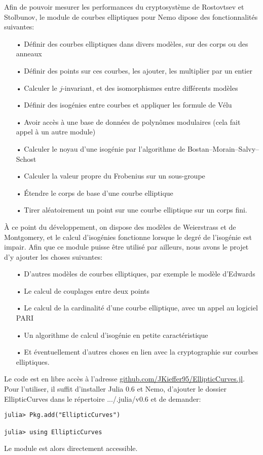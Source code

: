 \documentclass[11pt,a4paper]{article}
\renewcommand{\v}{\vspace{5mm}}
\theoremstyle{definition}
\begin{document}
Afin de pouvoir mesurer les performances du cryptosystème de Rostovtsev et Stolbunov, le module de courbes elliptiques pour Nemo dipose des fonctionnalités suivantes:
\begin{itemize}
\item[•] Définir des courbes elliptiques dans divers modèles, sur des corps ou des anneaux
\item[•] Définir des points sur ces courbes, les ajouter, les multiplier par un entier
\item[•] Calculer le $j$-invariant, et des isomorphismes entre différents modèles
\item[•] Définir des isogénies entre courbes et appliquer les formule de Vélu
\item[•] Avoir accès à une base de données de polynômes modulaires (cela fait appel à un autre module)
\item[•] Calculer le noyau d'une isogénie par l'algorithme de Bostan--Morain--Salvy--Schost
\item[•] Calculer la valeur propre du Frobenius sur un sous-groupe
\item[•] Étendre le corps de base d'une courbe elliptique
\item[•] Tirer aléatoirement un point sur une courbe elliptique sur un corps fini.
\end{itemize}

\v
À ce point du développement, on dispose des modèles de Weierstrass et de Montgomery, et le calcul d'isogénies fonctionne lorsque le degré de l'isogénie est impair. Afin que ce module puisse être utilisé par ailleurs, nous avons le projet d'y ajouter les choses suivantes:

\begin{itemize}
\item[•] D'autres modèles de courbes elliptiques, par exemple le modèle d'Edwards
\item[•] Le calcul de couplages entre deux points
\item[•] Le calcul de la cardinalité d'une courbe elliptique, avec un appel au logiciel PARI
\item[•] Un algorithme de calcul d'isogénie en petite caractéristique
\item[•] Et éventuellement d'autres choses en lien avec la cryptographie sur courbes elliptiques.
\end{itemize}

Le code est en libre accès à l'adresse \url{github.com/JKieffer95/EllipticCurves.jl}. Pour l'utiliser, il suffit d'installer Julia 0.6 et Nemo, d'ajouter le dossier EllipticCurves dans le répertoire .../.julia/v0.6 et de demander: 
\begin{verbatim}
julia> Pkg.add("EllipticCurves")

julia> using EllipticCurves
\end{verbatim}
Le module est alors directement accessible.
\end{document}
